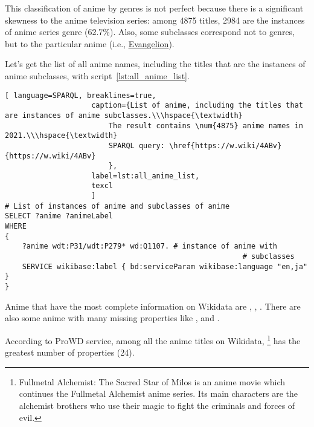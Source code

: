 This classification of anime by genres is not perfect because there is a significant skewness to the anime television series: among \num{4875} titles, {2984} are the instances of anime series genre (\num{62,7}\%). Also, some subclasses correspond not to genres, but to the particular anime (i.e., \href{https://w.wiki/3iKe}{Evangelion}).

Let's get the list of all anime names, including the titles that are the instances of anime subclasses, with script~\protect\ref{lst:all_anime_list}.

\begin{lstlisting}[ language=SPARQL, breaklines=true, 
                    caption={List of anime, including the titles that are instances of anime subclasses.\\\hspace{\textwidth}
                        The result contains \num{4875} anime names in 2021.\\\hspace{\textwidth}
                        SPARQL query: \href{https://w.wiki/4ABv}{https://w.wiki/4ABv}
                        },
                    label=lst:all_anime_list,
                    texcl 
                    ]
# List of instances of anime and subclasses of anime
SELECT ?anime ?animeLabel
WHERE
{
    ?anime wdt:P31/wdt:P279* wd:Q1107. # instance of anime with
                                                       # subclasses
    SERVICE wikibase:label { bd:serviceParam wikibase:language "en,ja" }
}
\end{lstlisting}%

Anime that have the most complete information on Wikidata are , , . There are also some anime with many missing properties like ,  and .

According to ProWD service, among all the anime titles on Wikidata, \footnote{Fullmetal Alchemist: The Sacred Star of Milos is an anime movie which continues the Fullmetal Alchemist anime series. Its main characters are the alchemist brothers who use their magic to fight the criminals and forces of evil.} has the greatest number of properties (\num{24}).